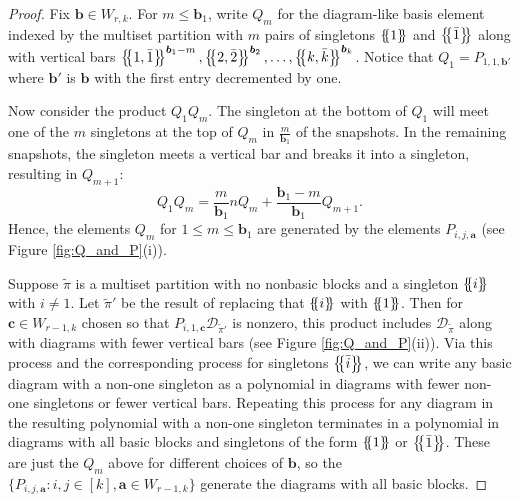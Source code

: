 \documentclass[ALCO,Unicode,published]{cedram}
\newcommand{\DD}{\mathcal{D}}
\newcommand{\bfa}{{\boldsymbol{a}}}
\newcommand{\bfb}{{\boldsymbol{b}}}
\newcommand{\bfc}{{\boldsymbol{c}}}
\newcommand{\tpi}{{\tilde{\pi}}}
\newcommand{\multi}[1]{\left\{\mskip-5mu\left\{#1\right\}\mskip-5mu\right\}}
\newcommand{\ov}[1]{\bar{#1}}
\begin{document}
\begin{proof}
    Fix $\bfb\in W_{r,k}$. For $m\leq\bfb_1$, write $Q_m$ for the diagram-like basis element indexed by the multiset partition with $m$ pairs of singletons $\multi{1}$ and $\multi{\ov1}$ along with vertical bars $\multi{1,\ov1}^{\bfb_1-m},\multi{2,\ov2}^{\bfb_2},\dots,\multi{k,\ov k}^{\bfb_k}$. Notice that $Q_1=P_{1,1,\bfb'}$ where $\bfb'$ is $\bfb$ with the first entry decremented by one.

    Now consider the product $Q_1Q_m$. The singleton at the bottom of $Q_1$ will meet one of the $m$ singletons at the top of $Q_m$ in $\frac{m}{\bfb_1}$ of the snapshots. In the remaining snapshots, the singleton meets a vertical bar and breaks it into a singleton, resulting in $Q_{m+1}$: \[Q_1Q_m=\frac{m}{\bfb_1}nQ_m+\frac{\bfb_1-m}{\bfb_1}Q_{m+1}.\] Hence, the elements $Q_m$ for $1\leq m\leq \bfb_1$ are generated by the elements $P_{i,j,\bfa}$ (see Figure \ref{fig:Q_and_P}(i)).

    Suppose $\tpi$ is a multiset partition with no nonbasic blocks and a singleton $\multi{i}$ with $i\neq 1$. Let $\tpi'$ be the result of replacing that $\multi{i}$ with $\multi{1}$. Then for $\bfc\in W_{r-1,k}$ chosen so that $P_{i,1,\bfc}\DD_{\tpi'}$ is nonzero, this product includes $\DD_\tpi$ along with diagrams with fewer vertical bars (see Figure \ref{fig:Q_and_P}(ii)). Via this process and the corresponding process for singletons $\multi{\ov i}$, we can write any basic diagram with a non-one singleton as a polynomial in diagrams with fewer non-one singletons or fewer vertical bars. Repeating this process for any diagram in the resulting polynomial with a non-one singleton terminates in a polynomial in diagrams with all basic blocks and singletons of the form $\multi{1}$ or $\multi{\ov 1}$. These are just the $Q_m$ above for different choices of $\bfb$, so the $\{P_{i,j,\bfa}:i,j\in[k],\bfa\in W_{r-1,k}\}$ generate the diagrams with all basic blocks.
\end{proof}
\end{document}
